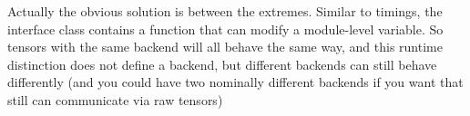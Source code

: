 \documentclass[12pt,letterpaper]{article}
\begin{document}
Actually the obvious solution is between the extremes.  Similar to timings, the interface class
contains a function that can modify a module-level variable.  So tensors with the same backend will
all behave the same way, and this runtime distinction does not define a backend, but different backends
can still behave differently (and you could have two nominally different backends if you want that 
still can communicate via raw tensors)
\end{document}
